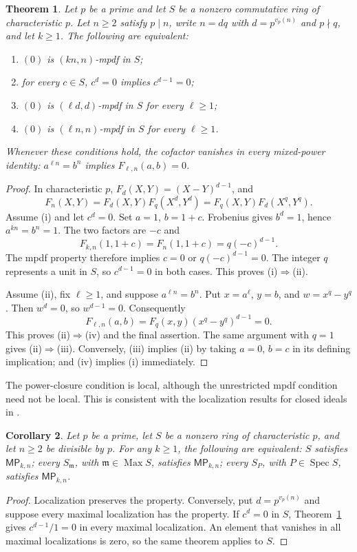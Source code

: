 \documentclass[11pt,a4paper]{amsart}
\newtheorem{theorem}{Theorem}[section]
\newtheorem{corollary}[theorem]{Corollary}
\theoremstyle{definition}
\theoremstyle{remark}
\DeclareMathOperator{\Spec}{Spec}
\newcommand{\MP}[2]{\mathsf{MP}_{#1,#2}}
\numberwithin{equation}{section}
\begin{document}
\begin{theorem}\label{thm:exact-p-part}
Let $p$ be a prime and let $S$ be a nonzero commutative ring of characteristic
$p$. Let
$n\geq2$ satisfy $p\mid n$, write $n=dq$ with
$d=p^{v_p(n)}$ and $p\nmid q$, and let $k\geq1$.
The following are equivalent:
\begin{enumerate}
\item $(0)$ is $(kn,n)$-mpdf in $S$;
\item for every $c\in S$, $c^d=0$ implies $c^{d-1}=0$;
\item $(0)$ is $(\ell d,d)$-mpdf in $S$ for every $\ell\geq1$;
\item $(0)$ is $(\ell n,n)$-mpdf in $S$ for every $\ell\geq1$.
\end{enumerate}
Whenever these conditions hold, the cofactor vanishes in every mixed-power
identity: $a^{\ell n}=b^n$ implies $F_{\ell,n}(a,b)=0$.
\end{theorem}
\begin{proof}
In characteristic $p$, $F_d(X,Y)=(X-Y)^{d-1}$, and
\[
 F_n(X,Y)=F_d(X,Y)F_q(X^d,Y^d)
         =F_q(X,Y)F_d(X^q,Y^q).
\]
Assume (i) and let $c^d=0$. Set $a=1$, $b=1+c$.
Frobenius gives $b^d=1$, hence $a^{kn}=b^n=1$.
The two factors are $-c$ and
\[
 F_{k,n}(1,1+c)=F_n(1,1+c)=q(-c)^{d-1}.
\]
The mpdf property therefore implies $c=0$ or $q(-c)^{d-1}=0$.
The integer $q$ represents a unit in $S$, so $c^{d-1}=0$ in both cases.
This proves (i)$\Rightarrow$(ii).

Assume (ii), fix $\ell\geq1$, and suppose $a^{\ell n}=b^n$.
Put $x=a^\ell$, $y=b$, and $w=x^q-y^q$. Then $w^d=0$, so $w^{d-1}=0$.
Consequently
\[
 F_{\ell,n}(a,b)=F_q(x,y)(x^q-y^q)^{d-1}=0.
\]
This proves (ii)$\Rightarrow$(iv) and the final assertion.
The same argument with $q=1$ gives (ii)$\Rightarrow$(iii).
Conversely, (iii) implies (ii) by taking $a=0$, $b=c$ in its defining
implication; and (iv) implies (i) immediately.
\end{proof}


The power-closure condition is local, although the unrestricted mpdf
condition need not be local. This is consistent with the localization
results for closed ideals in \cite[Corollary~2.9]{ABclosed}.

\begin{corollary}\label{cor:charp-local}
Let $p$ be a prime, let $S$ be a nonzero ring of characteristic $p$, and let $n\ge2$ be
divisible by $p$. For any $k\ge1$, the following are equivalent:
$S$ satisfies $\MP{k}{n}$; every $S_{\mathfrak m}$, with
$\mathfrak m\in\operatorname{Max}S$, satisfies $\MP{k}{n}$; every
$S_P$, with $P\in\Spec S$, satisfies $\MP{k}{n}$.
\end{corollary}
\begin{proof}
Localization preserves the property. Conversely, put
$d=p^{v_p(n)}$ and suppose every maximal localization has the property.
If $c^d=0$ in $S$, Theorem~\ref{thm:exact-p-part} gives
$c^{d-1}/1=0$ in every maximal localization. An element that vanishes
in all maximal localizations is zero, so the same theorem applies to $S$.
\end{proof}
\end{document}
